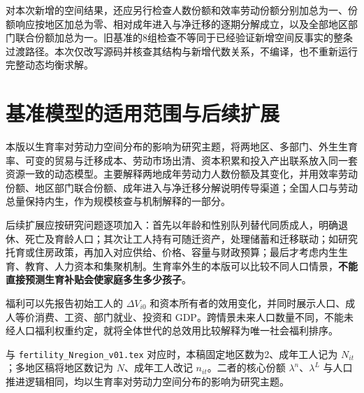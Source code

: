 \documentclass[UTF8,a4paper,zihao=-4,fontset=windows]{ctexart}
\numberwithin{equation}{section}
\begin{document}
对本次新增的空间结果，还应另行检查人数份额和效率劳动份额分别加总为一、份额响应按地区加总为零、相对成年进入与净迁移的逐期分解成立，以及全部地区部门联合份额加总为一。旧基准的8组检查不等同于已经验证新增空间反事实的整条过渡路径。本次仅改写源码并核查其结构与新增代数关系，不编译，也不重新运行完整动态均衡求解。

\section{基准模型的适用范围与后续扩展}
本版以生育率对劳动力空间分布的影响为研究主题，将两地区、多部门、外生生育率、可变的贸易与迁移成本、劳动市场出清、资本积累和投入产出联系放入同一套资源一致的动态模型。主要解释两地成年劳动力人数份额及其变化，并用效率劳动份额、地区部门联合份额、成年进入与净迁移分解说明传导渠道；全国人口与劳动总量保持内生，作为规模核查与机制解释的一部分。

后续扩展应按研究问题逐项加入：首先以年龄和性别队列替代同质成人，明确退休、死亡及育龄人口；其次让工人持有可随迁资产，处理储蓄和迁移联动；如研究托育或住房政策，再加入对应供给、价格、容量与财政预算；最后才考虑内生生育、教育、人力资本和集聚机制。生育率外生的本版可以比较不同人口情景，\textbf{不能直接预测生育补贴会使家庭多生多少孩子}。

福利可以先报告初始工人的 $\Delta V_{i0}$ 和资本所有者的效用变化，并同时展示人口、成人等价消费、工资、部门就业、投资和 GDP。跨情景未来人口数量不同，不能未经人口福利权重约定，就将全体世代的总效用比较解释为唯一社会福利排序。

与 \texttt{fertility\_Nregion\_v01.tex} 对应时，本稿固定地区数为2、成年工人记为 $N_{it}$；多地区稿将地区数记为 $N$、成年工人改记 $n_{it}$。二者的核心份额 $\lambda^n$、$\lambda^L$ 与人口推进逻辑相同，均以生育率对劳动力空间分布的影响为研究主题。

\appendix
\end{document}
